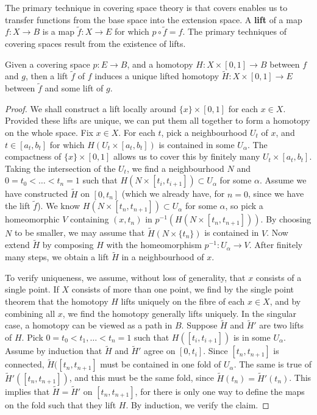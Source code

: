 The primary technique in covering space theory is that covers enables us to transfer functions from the base space into the extension space. A {\bf lift} of a map $f: X \to B$ is a map $\tilde{f}: X \to E$ for which $p \circ \tilde{f} = f$. The primary techniques of covering spaces result from the existence of lifts.

\begin{theorem}
    Given a covering space $p: E \to B$, and a homotopy $H: X \times [0,1] \to B$ between $f$ and $g$, then a lift $\tilde{f}$ of $f$ induces a unique lifted homotopy $\tilde{H}: X \times [0,1] \to E$ between $\tilde{f}$ and some lift of $g$.
\end{theorem}
\begin{proof}
    We shall construct a lift locally around $\{ x \} \times [0,1]$ for each $x \in X$. Provided these lifts are unique, we can put them all together to form a homotopy on the whole space. Fix $x \in X$. For each $t$, pick a neighbourhood $U_t$ of $x$, and $t \in [a_t, b_t]$ for which $H(U_t \times [a_t, b_t])$ is contained in some $U_\alpha$. The compactness of $\{ x \} \times [0,1]$ allows us to cover this by finitely many $U_t \times [a_t, b_t]$. Taking the intersection of the $U_t$, we find a neighbourhood $N$ and $0 = t_0 < \dots < t_n = 1$ such that $H(N \times [t_i, t_{i+1}]) \subset U_\alpha$ for some $\alpha$. Assume we have constructed $\tilde{H}$ on $[0,t_n]$ (which we already have, for $n = 0$, since we have the lift $\tilde{f}$). We know $H(N \times [t_n, t_{n+1}]) \subset U_\alpha$ for some $\alpha$, so pick a homeomorphic $V$ containing $(x,t_n)$ in $p^{-1}(H(N \times [t_n, t_{n+1}]))$. By choosing $N$ to be smaller, we may assume that $\tilde{H}(N \times \{ t_n \})$ is contained in $V$. Now extend $\tilde{H}$ by composing $H$ with the homeomorphism $p^{-1}: U_\alpha \to V$. After finitely many steps, we obtain a lift $\tilde{H}$ in a neighbourhood of $x$.

    To verify uniqueness, we assume, without loss of generality, that $x$ consists of a single point. If $X$ consists of more than one point, we find by the single point theorem that the homotopy $H$ lifts uniquely on the fibre of each $x \in X$, and by combining all $x$, we find the homotopy generally lifts uniquely. In the singular case, a homotopy can be viewed as a path in $B$. Suppose $\tilde{H}$ and $\tilde{H}'$ are two lifts of $H$. Pick $0 = t_0 < t_1, \dots < t_n = 1$ such that $H([t_i, t_{i+1}])$ is in some $U_\alpha$. Assume by induction that $\tilde{H}$ and $\tilde{H}'$ agree on $[0,t_i]$. Since $[t_n, t_{n+1}]$ is connected, $\tilde{H}([t_n, t_{n+1}]$ must be contained in one fold of $U_\alpha$. The same is true of $\tilde{H}'([t_n, t_{n+1}])$, and this must be the same fold, since $\tilde{H}(t_n) = \tilde{H}'(t_n)$. This implies that $\tilde{H} = \tilde{H}'$ on $[t_n, t_{n+1}]$, for there is only one way to define the maps on the fold such that they lift $H$. By induction, we verify the claim.
\end{proof}


